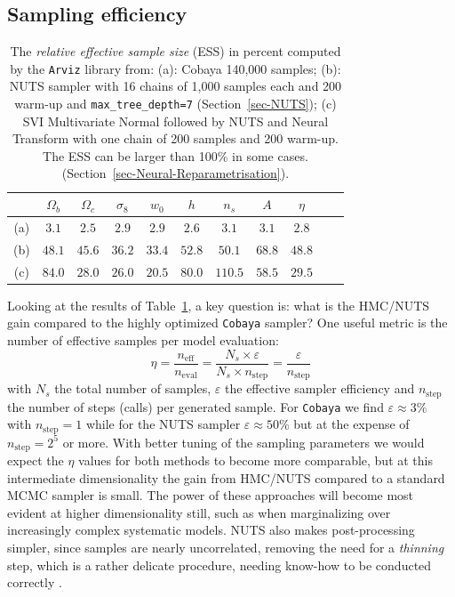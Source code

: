 \documentclass[twocolumn,twocolappendix,nofootinbib,iop]{openjournal}
\newcommand{\resubnote}[1]{#1} %
\begin{document}
\subsection{Sampling efficiency}
\label{sec-results}
\begin{table}[htb]
\caption{The \textit{relative effective sample size} (ESS) in percent computed by the \texttt{Arviz} library \citep{arviz_2019} from: 
(a): Cobaya \resubnote{140,000} samples;
(b): NUTS sampler with 16 chains of 1,000 samples each and 200 warm-up and \texttt{max\_tree\_depth=7} (Section~\ref{sec-NUTS}); 
(c) SVI Multivariate Normal followed by NUTS and Neural Transform  with one chain of 200 samples and 200 warm-up. The ESS can be larger than 100\% in some cases.  (Section~\ref{sec-Neural-Reparametrisation}).}
\label{tab-ESS-NUTS_SVI-1}
 \centering
\begin{tabular}{ccccccccccc}
\hline
    & $\Omega_b$ & $\Omega_c$ & $\sigma_8$ & $w_0$ & $h$ & $n_s$ & $A$ & $\eta$\\
\hline
(a) &  $3.1$ & $2.5$       & $2.9$      & $2.9$  & $2.6$  & $3.1$  & $3.1$ & $2.8$ \\  
(b) & $48.1$ &  $45.6$     & $36.2$     & $33.4$ & $52.8$ & $50.1$ & $68.8$ & $48.8$\\
(c) & $84.0$ &  $28.0$     & $26.0$     & $20.5$ & $80.0$ & $110.5$ & $58.5$ & $29.5$\\
\hline
\end{tabular}
\end{table}
%
Looking at the results of Table~\ref{tab-ESS-NUTS_SVI-1}, a key question is: what is the HMC/NUTS gain compared to the highly optimized \texttt{Cobaya} sampler? 
One useful metric is the number of effective samples per model evaluation:
\begin{equation}
    \eta = \frac{n_\mathrm{eff}}{n_\mathrm{eval}} = \frac{N_s \times \varepsilon}{N_s \times n_\mathrm{step}} = \frac{\varepsilon}{n_\mathrm{step}}
\end{equation}
with $N_s$ the total number of samples, $\varepsilon$ the effective sampler efficiency  and $n_\mathrm{step}$ the number of steps (calls) per generated sample. For \texttt{Cobaya} we find $\varepsilon\approx 3\%$ with $n_\mathrm{step}=1$ while for the NUTS sampler $\varepsilon\approx 50\%$ but at the expense of $n_\mathrm{step}=2^5$ or more. With better tuning of the sampling parameters we would expect the $\eta$ values for both methods to become more comparable, but at this intermediate dimensionality the gain from HMC/NUTS compared to a standard MCMC sampler is small. The power of these approaches will become most evident at higher dimensionality still, such as when marginalizing over increasingly complex systematic models. NUTS also makes post-processing simpler, since samples are nearly uncorrelated, removing the need for a \textit{thinning} step, which is a rather delicate procedure, needing know-how to be conducted correctly \citep{doi:10.1146/annurev-statistics-040220-091727, Owen2017}.
\end{document}
